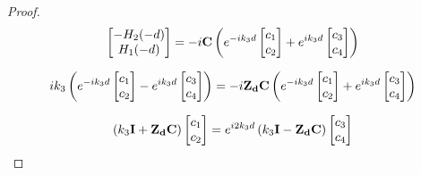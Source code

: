 \begin{proof}
            \begin{equation}
                \begin{bmatrix}
                    -H_2(-d)\\
                    H_1(-d)\\
                \end{bmatrix}
                =-i
                \mathbf{C}
                \left(
                    e^{-ik_3 d}
                    \begin{bmatrix}
                        c_1 \\
                        c_2
                    \end{bmatrix}
                    +e^{ik_3 d}
                    \begin{bmatrix}
                        c_3 \\
                        c_4
                    \end{bmatrix}
                \right)
            \end{equation}

            \begin{equation}
                ik_3\left( e^{-ik_3 d}
                \begin{bmatrix}
                    c_1 \\
                    c_2
                \end{bmatrix}
                -e^{ik_3 d}
                \begin{bmatrix}
                    c_3 \\
                    c_4
                \end{bmatrix}
                \right)
                =-i\mathbf{Z_d}\mathbf{C}
                \left(
                    e^{-ik_3 d}
                    \begin{bmatrix}
                        c_1 \\
                        c_2
                    \end{bmatrix}
                    +e^{ik_3 d}
                    \begin{bmatrix}
                        c_3 \\
                        c_4
                    \end{bmatrix}
                \right)
            \end{equation}

            \begin{equation}
                \left(k_3\mathbf{I} + \mathbf{Z_d}\mathbf{C}\right)
                \begin{bmatrix}
                    c_1 \\
                    c_2
                \end{bmatrix}
                = e^{i2k_3 d} \left(k_3\mathbf{I} - \mathbf{Z_d}\mathbf{C}\right)
                \begin{bmatrix}
                    c_3 \\
                    c_4
                \end{bmatrix}
            \end{equation}


\end{proof}
